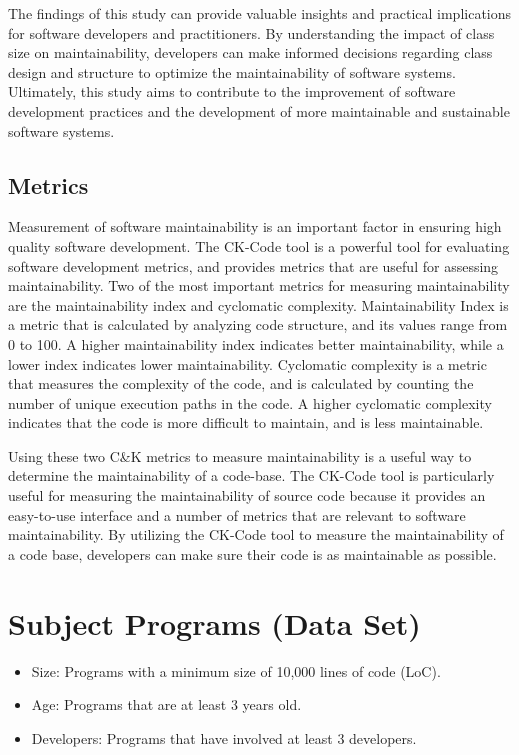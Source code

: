 \documentclass[conference]{IEEEtran}
\begin{document}
	The findings of this study can provide valuable insights and practical implications for software developers and practitioners. By understanding the impact of class size on maintainability, developers can make informed decisions regarding class design and structure to optimize the maintainability of software systems. Ultimately, this study aims to contribute to the improvement of software development practices and the development of more maintainable and sustainable software systems.
	
	\subsection{Metrics}
	Measurement of software maintainability is an important factor in ensuring high quality software development. The CK-Code tool is a powerful tool for evaluating software development metrics, and provides metrics that are useful for assessing maintainability. Two of the most important metrics for measuring maintainability are the maintainability index and cyclomatic complexity. Maintainability Index is a metric that is calculated by analyzing code structure, and its values range from 0 to 100. A higher maintainability index indicates better maintainability, while a lower index indicates lower maintainability. Cyclomatic complexity is a metric that measures the complexity of the code, and is calculated by counting the number of unique execution paths in the code. A higher cyclomatic complexity indicates that the code is more difficult to maintain, and is less maintainable. 
	
	Using these two C\&K metrics to measure maintainability is a useful way to determine the maintainability of a code-base. The CK-Code tool is particularly useful for measuring the maintainability of source code because it provides an easy-to-use interface and a number of metrics that are relevant to software maintainability. By utilizing the CK-Code tool to measure the maintainability of a code base, developers can make sure their code is as maintainable as possible.
	
	\section{Subject Programs (Data Set)}
	
	\begin{itemize}
		\item Size: Programs with a minimum size of 10,000 lines of code (LoC).
		\item Age: Programs that are at least 3 years old.
		\item Developers: Programs that have involved at least 3 developers.
	\end{itemize}
\end{document}
